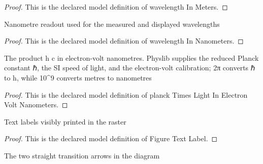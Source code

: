 \begin{proof}
  This is the declared model definition of wavelength In Meters.
\end{proof}
\begin{definition}
  \label{def:physics:phyx-mini-0637:phyxminiproblems-problemphyxmini0637-wavelengthinnanometers}
  Nanometre readout used for the measured and displayed wavelengths
\end{definition}
\begin{proof}
  This is the declared model definition of wavelength In Nanometers.
\end{proof}
\begin{definition}
  \label{def:physics:phyx-mini-0637:phyxminiproblems-problemphyxmini0637-plancktimeslightinelectronvoltnanometers}
  The product h c in electron-volt nanometres. Physlib supplies the reduced Planck constant ℏ, the SI speed of light, and the electron-volt calibration; 2π converts ℏ to h, while 10\textasciicircum{}9 converts metres to nanometres
\end{definition}
\begin{proof}
  This is the declared model definition of planck Times Light In Electron Volt Nanometers.
\end{proof}
\begin{definition}
  \label{def:physics:phyx-mini-0637:phyxminiproblems-problemphyxmini0637-figuretextlabel}
  Text labels visibly printed in the raster
\end{definition}
\begin{proof}
  This is the declared model definition of Figure Text Label.
\end{proof}
\begin{definition}
  \label{def:physics:phyx-mini-0637:phyxminiproblems-problemphyxmini0637-transitionarrow}
  The two straight transition arrows in the diagram
\end{definition}
